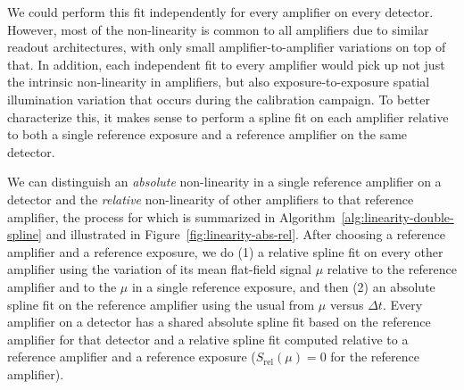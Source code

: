 We could perform this fit independently for every amplifier on every detector. However, most of the non-linearity is common to all amplifiers due to similar readout architectures, with only small amplifier-to-amplifier variations on top of that.
In addition, each independent fit to every amplifier would pick up not just the intrinsic non-linearity in amplifiers, but also exposure-to-exposure spatial illumination variation that occurs during the calibration campaign.
To better characterize this, it makes sense to perform a spline fit on each amplifier relative to both a single reference exposure and a reference amplifier on the same detector.

We can distinguish an \emph{absolute} non-linearity in a single reference amplifier on a detector and the \emph{relative} non-linearity of other amplifiers to that reference amplifier, the process for which is summarized in Algorithm~\ref{alg:linearity-double-spline} and illustrated in Figure~\ref{fig:linearity-abs-rel}.
After choosing a reference amplifier and a reference exposure, we do (1) a relative spline fit on every other amplifier using  the variation of its mean flat-field signal $\mu$ relative to the reference amplifier and to the $\mu$ in a single reference exposure, and then (2)
an absolute spline fit on the reference amplifier using the usual from $\mu$ versus $\Delta t$.
Every amplifier on a detector has a shared absolute spline fit based on the reference amplifier for that detector and a relative spline fit computed relative to a reference amplifier and a reference exposure ($S_{\mathrm{rel}}(\mu) = 0$ for the reference amplifier).

